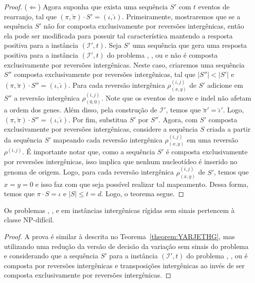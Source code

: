 \begin{proof}
($\Leftarrow$) Agora suponha que exista uma sequência $S'$ com $t$ eventos de rearranjo, tal que $(\pi,\breve\pi) \cdot S' = (\iota,\breve\iota)$. Primeiramente, mostraremos que se a sequência $S'$ não for composta exclusivamente por reversões intergênicas, então ela pode ser modificada para possuir tal característica mantendo a resposta positiva para a instância $(\mathcal{I'},t)$. Seja $S'$ uma sequência que gera uma resposta positiva para a instância $(\mathcal{I'},t)$ do problema \SbIR{}, \SbIRI{}, \SbIRM{} ou \SbIRMI{} e não é composta exclusivamente por reversões intergênicas. Neste caso, criaremos uma sequência $S''$ composta exclusivamente por reversões intergênicas, tal que  $|S''| < |S'|$ e $(\pi,\breve\pi) \cdot S'' = (\iota,\breve\iota)$. Para cada reversão intergênica $\rho^{(i,j)}_{(x,y)}$ de $S'$ adicione em $S''$ a reversão intergênica $\rho^{(i,j)}_{(0,0)}$. Note que os eventos de move e indel não afetam a ordem dos genes. Além disso, pela construção de $\mathcal{I'}$, temos que $\breve\pi' = \breve\iota'$. Logo, $(\pi,\breve\pi) \cdot S'' = (\iota,\breve\iota)$. Por fim, substitua $S'$ por $S''$. Agora, com $S'$ composta exclusivamente por reversões intergênicas, considere a sequência $S$ criada a partir da sequência $S'$ mapeando cada reversão intergênica $\rho^{(i,j)}_{(x,y)}$ em uma reversão $\rho^{(i,j)}$. É importante notar que, como a sequência $S'$ é composta exclusivamente por reversões intergênicas, isso implica que nenhum nucleotídeo é inserido no genoma de origem. Logo, para cada reversão intergênica $\rho^{(i,j)}_{(x,y)}$ de $S'$, temos que $x=y=0$ e isso faz com que seja possível realizar tal mapeamento. Dessa forma, temos que $\pi \cdot S = \iota$ e $|S| \le t = d $. Logo, o teorema segue.
\end{proof}

\begin{theorem}\label{theorem:RDOZOOIB}
Os problemas \SbIRT, \SbIRTI, \SbIRTM{} e \SbIRTMI{} em instâncias intergênicas rígidas sem sinais pertencem à classe NP-difícil.
\end{theorem}
\begin{proof}
A prova é similar à descrita no Teorema~\ref{theorem:YARJETHG}, mas utilizando uma redução da versão de decisão da variação sem sinais do problema \SbRT{} e considerando que a sequência $S'$ para a instância $(\mathcal{I'},t)$ do problema \SbIRT{}, \SbIRTI{}, \SbIRTM{} ou \SbIRTMI{} é composta por reversões intergênicas e transposições intergênicas ao invés de ser composta exclusivamente por reversões intergênicas.
\end{proof}

